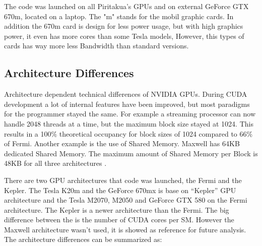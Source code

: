  The code was launched on all Piritakua's GPUs and on external GeForce GTX 670m, located on a laptop. The "m" stands for the mobil graphic cards. In addition the 670m card is design for less power usage, but with high graphics power, it even has more cores than some Tesla models, However, this types of cards has way more less Bandwidth than standard versions.
   
\subsection{Architecture Differences}

  Architecture dependent technical differences of NVIDIA GPUs. During CUDA development a lot of internal features have been improved, but most paradigms for the programmer stayed the same. For example a streaming processor can now handle 2048 threads at a time, but the maximum block size stayed at 1024. This results in a 100$\%$ theoretical occupancy for block sizes of 1024 compared to 66$\%$ of Fermi. Another example is the use of Shared Memory. Maxwell has 64KB dedicated Shared Memory. The maximum amount of Shared Memory per Block is 48KB for all three architectures \cite{hoermanngpu}.
  
  There are two GPU architectures that code was launched, the Fermi and the Kepler. The Tesla K20m and the GeForce 670mx is base on ``Kepler'' GPU architecture and the Tesla M2070, M2050 and GeForce GTX 580 on the Fermi architecture. The Kepler is a newer architecture than the Fermi. The big difference between the is the number of CUDA cores per SM. However the Maxwell architecture wasn't used, it is showed as reference for future analysis. The architecture differences can be summarized as:
  
